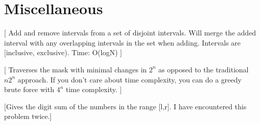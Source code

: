 \chapter{Miscellaneous}


[
    Add and remove intervals from a set of disjoint intervals. Will merge the added interval with 
    any overlapping intervals in the set when adding. Intervals are {[inclusive, exclusive)}. Time: O(logN)
]

[
    Traverses the mask with minimal changes in $2^n$ as opposed to the traditional $n2^n$ approach.
    If you don't care about time complexity, you can do a greedy brute force with $4^n$ time complexity.
]





[Gives the digit sum of the numbers in the range [l,r]. I have encountered this problem twice.]


